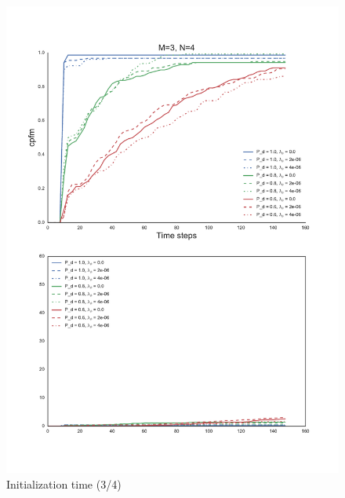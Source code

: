 {\begin{figure}
\centering
\includegraphics[height = .9\textheight]{Figures/plots/Scenario1_Init-Time(3-4).pdf}
\caption{Initialization time (3/4)}\label{fig:init_time_3-4}
\end{figure}

}
